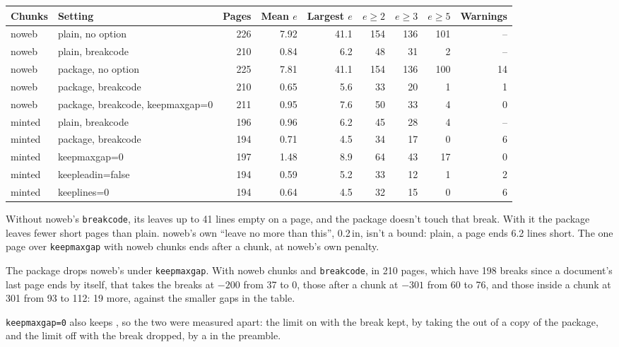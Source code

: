 \begin{center}\small
\begin{tabular}{@{}llrrrrrrr@{}}
\toprule
Chunks & Setting & Pages & Mean $e$ & Largest $e$ & $e\ge2$ & $e\ge3$ & $e\ge5$ & Warnings \\
\midrule
noweb & plain, no option & 226 & 7.92 & 41.1 & 154 & 136 & 101 & -- \\
noweb & plain, breakcode & 210 & 0.84 & 6.2 & 48 & 31 & 2 & -- \\
noweb & package, no option & 225 & 7.81 & 41.1 & 154 & 136 & 100 & 14 \\
noweb & package, breakcode & 210 & 0.65 & 5.6 & 33 & 20 & 1 & 1 \\
noweb & package, breakcode, keepmaxgap=0 & 211 & 0.95 & 7.6 & 50 & 33 & 4 & 0 \\
minted & plain, breakcode & 196 & 0.96 & 6.2 & 45 & 28 & 4 & -- \\
minted & package, breakcode & 194 & 0.71 & 4.5 & 34 & 17 & 0 & 6 \\
minted & keepmaxgap=0 & 197 & 1.48 & 8.9 & 64 & 43 & 17 & 0 \\
minted & keepleadin=false & 194 & 0.59 & 5.2 & 33 & 12 & 1 & 2 \\
minted & keeplines=0 & 194 & 0.64 & 4.5 & 32 & 15 & 0 & 6 \\
\bottomrule
\end{tabular}
\end{center}

Without \textsf{noweb}'s \texttt{breakcode}, its  leaves up to 41 lines empty on a page,
and the package doesn't touch that break.
With it the package leaves fewer short pages than plain.
\textsf{noweb}'s own \enquote{leave no more than this}, 0.2\,in, isn't a bound: plain, a page ends
6.2 lines short.
The one page over \texttt{keepmaxgap} with \textsf{noweb} chunks ends after a chunk, at
\textsf{noweb}'s own penalty.

The package drops \textsf{noweb}'s  under \texttt{keepmaxgap}.
With \textsf{noweb} chunks and \texttt{breakcode}, in 210 pages, which have 198 breaks since a
document's last page ends by itself, that takes the breaks at
$-200$ from 37 to 0, those after a chunk at $-301$ from 60 to 76, and those inside a chunk at 301 from
93 to 112: 19 more, against the smaller gaps in the table.

\texttt{keepmaxgap=0} also keeps , so the two were measured apart: the limit on with
the break kept, by taking the  out of a copy of the package, and the limit off with the
break dropped, by a  in the preamble.

